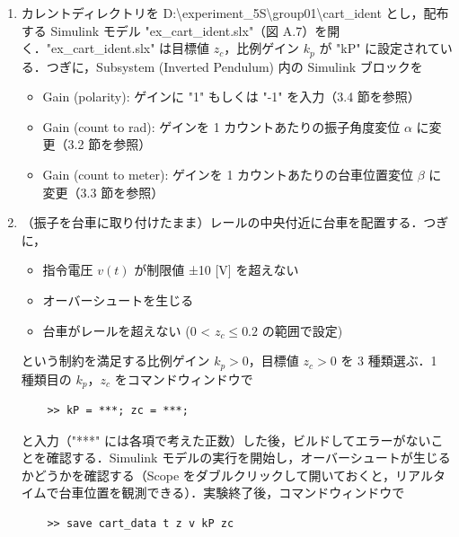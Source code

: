 \begin{enumerate}
  \item カレントディレクトリを D:\textbackslash experiment\_5S\textbackslash group01\textbackslash cart\_ident とし，配布する Simulink モデル "ex\_cart\_ident.slx"（図 A.7）を開く．"ex\_cart\_ident.slx" は目標値 \( z_c \)，比例ゲイン \( k_p \) が "kP" に設定されている．つぎに，Subsystem (Inverted Pendulum) 内の Simulink ブロックを
        \begin{itemize}
          \item Gain (polarity): ゲインに "1" もしくは "-1" を入力（3.4 節を参照）
          \item Gain (count to rad): ゲインを 1 カウントあたりの振子角度変位 \( \alpha \) に変更（3.2 節を参照）
          \item Gain (count to meter): ゲインを 1 カウントあたりの台車位置変位 \( \beta \) に変更（3.3 節を参照）
        \end{itemize}
  \item （振子を台車に取り付けたまま）レールの中央付近に台車を配置する．つぎに，
        \begin{itemize}
          \item 指令電圧 \( v(t) \) が制限値 ±10 [V] を超えない
          \item オーバーシュートを生じる
          \item 台車がレールを超えない (0 < \( z_c \leq 0.2 \) の範囲で設定)
        \end{itemize}
        という制約を満足する比例ゲイン \( k_p > 0 \)，目標値 \( z_c > 0 \) を 3 種類選ぶ．1 種類目の \( k_p \)，\( z_c \) をコマンドウィンドウで
        \begin{tcolorbox}[colback=gray!5!white,colframe=gray!75!black]
          \begin{lstlisting}
    >> kP = ***; zc = ***;
    \end{lstlisting}
        \end{tcolorbox}
        と入力（"***" には各項で考えた正数）した後，ビルドしてエラーがないことを確認する．Simulink モデルの実行を開始し，オーバーシュートが生じるかどうかを確認する（Scope をダブルクリックして開いておくと，リアルタイムで台車位置を観測できる）．実験終了後，コマンドウィンドウで
        \begin{tcolorbox}[colback=gray!5!white,colframe=gray!75!black]
          \begin{lstlisting}
    >> save cart_data t z v kP zc
    \end{lstlisting}
        \end{tcolorbox}

\end{enumerate}
